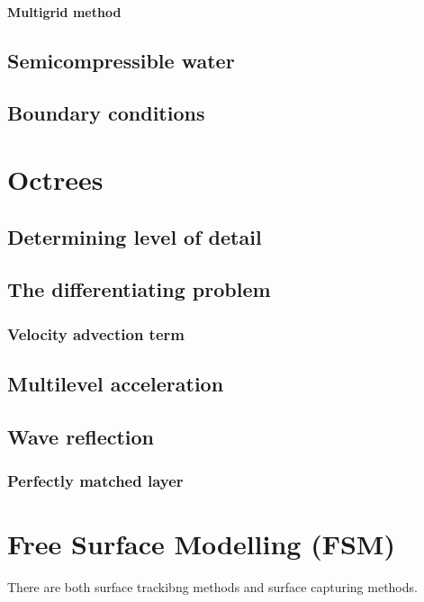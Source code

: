 \documentclass[]{report}
\begin{document}
\subsubsection{Multigrid method}

\section{Semicompressible water}

\section{Boundary conditions}

\chapter{Octrees}

\section{Determining level of detail}

\section{The differentiating problem}

\subsection{Velocity advection term}

\section{Multilevel acceleration}

\section{Wave reflection}

\subsection{Perfectly matched layer}

\chapter{Free Surface Modelling (FSM)}

There are both surface trackibng methods and surface capturing methods.
\end{document}
